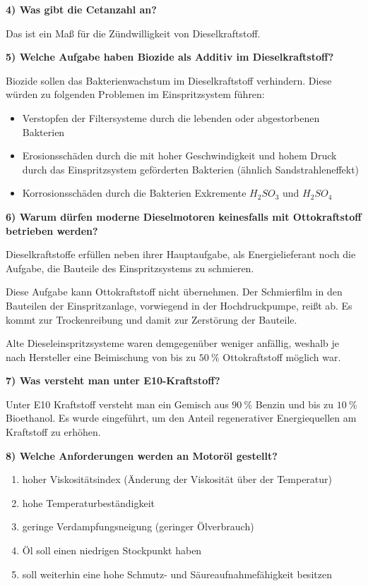 \textbf{4) Was gibt die Cetanzahl an?}

Das ist ein Maß für die Zündwilligkeit von Dieselkraftstoff.

\textbf{5) Welche Aufgabe haben Biozide als Additiv im
Dieselkraftstoff?}

Biozide sollen das Bakterienwachstum im Dieselkraftstoff verhindern.
Diese würden zu folgenden Problemen im Einspritzsystem führen:

\begin{itemize}
\item
  Verstopfen der Filtersysteme durch die lebenden oder abgestorbenen
  Bakterien
\item
  Erosionsschäden durch die mit hoher Geschwindigkeit und hohem Druck
  durch das Einspritzsystem geförderten Bakterien (ähnlich
  Sandstrahleneffekt)
\item
  Korrosionsschäden durch die Bakterien Exkremente $H_2SO_3$ und
  $H_2SO_4$
\end{itemize}

\textbf{6) Warum dürfen moderne Dieselmotoren keinesfalls mit
Ottokraftstoff betrieben werden?}

Dieselkraftstoffe erfüllen neben ihrer Hauptaufgabe, als
Energielieferant noch die Aufgabe, die Bauteile des Einspritzsystems zu
schmieren.

Diese Aufgabe kann Ottokraftstoff nicht übernehmen. Der Schmierfilm in
den Bauteilen der Einspritzanlage, vorwiegend in der Hochdruckpumpe,
reißt ab. Es kommt zur Trockenreibung und damit zur Zerstörung der
Bauteile.

Alte Dieseleinspritzsysteme waren demgegenüber weniger anfällig, weshalb
je nach Hersteller eine Beimischung von bis zu $50~\%$ Ottokraftstoff
möglich war.

\textbf{7) Was versteht man unter E10-Kraftstoff?}

Unter E10 Kraftstoff versteht man ein Gemisch aus $90~\%$ Benzin und
bis zu $10~\%$ Bioethanol. Es wurde eingeführt, um den Anteil
regenerativer Energiequellen am Kraftstoff zu erhöhen.

\textbf{8) Welche Anforderungen werden an Motoröl gestellt?}

\begin{enumerate}
\item
  hoher Viskositätsindex (Änderung der Viskosität über der Temperatur)
\item
  hohe Temperaturbeständigkeit
\item
  geringe Verdampfungsneigung (geringer Ölverbrauch)
\item
  Öl soll einen niedrigen Stockpunkt haben
\item
  soll weiterhin eine hohe Schmutz- und Säureaufnahmefähigkeit besitzen
\end{enumerate}

